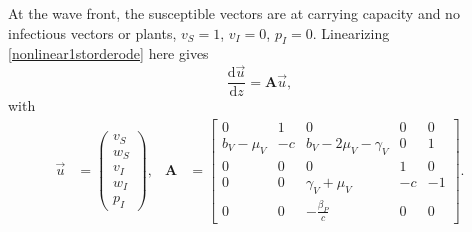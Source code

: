 \documentclass{article}
\newcommand{\md}{\mathrm{d}}
\newcommand{\mat}[1]{\mathbf{#1}}
\begin{document}
At the wave front, the susceptible vectors are at carrying capacity
and no infectious vectors or plants,
$v_S = 1$, $v_I = 0$, $p_I = 0$.
Linearizing \eqref{nonlinear1storderode} here gives
\begin{equation}
  \frac{\md \vec{u}}{\md z}
  = \mat{A} \vec{u},
\end{equation}
with
\begin{align}
  \vec{u} &=
  \begin{pmatrix}
    v_S \\ w_S \\ v_I \\ w_I \\ p_I
  \end{pmatrix},
  &
  \mat{A} &=
  \begin{bmatrix}
    0 & 1 & 0 & 0 & 0
    \\
    b_V - \mu_V & - c & b_V - 2 \mu_V - \gamma_V & 0 & 1
    \\
    0 & 0 & 0 & 1 & 0 \\
    0 & 0 & \gamma_V + \mu_V & - c & - 1 \\
    0 & 0 & - \frac{\beta_P}{c} & 0 & 0
  \end{bmatrix}.
\end{align}
\end{document}
